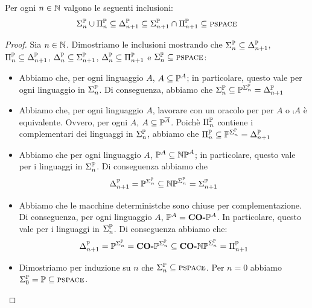 \begin{thm}
    Per ogni $n \in \mathbb{N}$ valgono le seguenti inclusioni:
    \begin{equation*}
        \Sigma_{n}^{\mathbb{P}} \cup \Pi_{n}^{\mathbb{P}} \subseteq \Delta_{n+1}^{\mathbb{P}} \subseteq
        \Sigma_{n+1}^{\mathbb{P}} \cap \Pi_{n+1}^{\mathbb{P}} \subseteq \textsc{pspace}
    \end{equation*}
\end{thm}
\begin{proof}

    Sia $n \in \mathbb{N}$. Dimostriamo le inclusioni mostrando che $\Sigma_{n}^{\mathbb{P}} \subseteq
    \Delta_{n+1}^{\mathbb{P}}$, $\Pi_{n}^{\mathbb{P}} \subseteq \Delta_{n+1}^{\mathbb{P}}$,
    $\Delta_{n}^{\mathbb{P}} \subseteq \Sigma_{n+1}^{\mathbb{P}}$, $\Delta_{n}^{\mathbb{P}} \subseteq
    \Pi_{n+1}^{\mathbb{P}}$ e $\Sigma_{n}^{\mathbb{P}} \subseteq \textsc{pspace}$:
    \begin{itemize}
        \item Abbiamo che, per ogni linguaggio $A$, $A \subseteq \mathbb{P}^{A}$; in particolare,
            questo vale per ogni linguaggio in
            $\Sigma_{n}^{\mathbb{P}}$. Di conseguenza, abbiamo che $\Sigma_{n}^{\mathbb{P}} \subseteq \mathbb{P}^{\Sigma_{n}^{\mathbb{P}}} =
            \Delta_{n+1}^{\mathbb{P}}$
        \item Abbiamo che, per ogni linguaggio $A$, lavorare con un oracolo per per $A$ o
            $\comp{A}$ è equivalente. Ovvero, per ogni $A$, $A \subseteq \mathbb{P}^{\overline{A}}$.
            Poichè $\Pi_{n}^{\mathbb{P}}$ contiene i complementari dei linguaggi in
            $\Sigma_{n}^{\mathbb{P}}$, abbiamo che $\Pi_{n}^{\mathbb{P}} \subseteq
            \mathbb{P}^{\Sigma_{n}^{\mathbb{P}}} = \Delta_{n+1}^{\mathbb{P}}$
        \item Abbiamo che per ogni linguaggio $A$, $\mathbb{P}^{A} \subseteq \mathbb{NP}^{A}$; in
            particolare, questo vale per i linguaggi in $\Sigma_{n}^{\mathbb{P}}$. Di conseguenza
            abbiamo che
            \begin{equation*}
                \Delta_{n+1}^{\mathbb{P}} = \mathbb{P}^{\Sigma_{n}^{\mathbb{P}}} \subseteq \mathbb{NP}^{\Sigma_{n}^{\mathbb{P}}} =
                \Sigma_{n+1}^{\mathbb{P}}
            \end{equation*}
        \item Abbiamo che le macchine deterministche sono chiuse per complementazione. Di
            conseguenza, per ogni linguaggio $A$, $\mathbb{P}^{A} = \textbf{CO-}\mathbb{P}^{A}$. In particolare,
            questo vale per i linguaggi in $\Sigma_{n}^{\mathbb{P}}$. Di conseguenza abbiamo che:
            \begin{equation*}
                \Delta_{n+1}^{\mathbb{P}} = \mathbb{P}^{\Sigma_{n}^{\mathbb{P}}} = \textbf{CO-}\mathbb{P}^{\Sigma_{n}^{\mathbb{P}}} \subseteq
                \textbf{CO-}\mathbb{NP}^{\Sigma_{n}^{\mathbb{P}}} = \Pi_{n+1}^{\mathbb{P}}
            \end{equation*}
        \item Dimostriamo per induzione su $n$ che $\Sigma_{n}^{\mathbb{P}} \subseteq \textsc{pspace}$. Per $n = 0$
            abbiamo $\Sigma_{0}^{\mathbb{P}} = \mathbb{P} \subseteq \textsc{pspace}$.


\end{itemize}
\end{proof}
